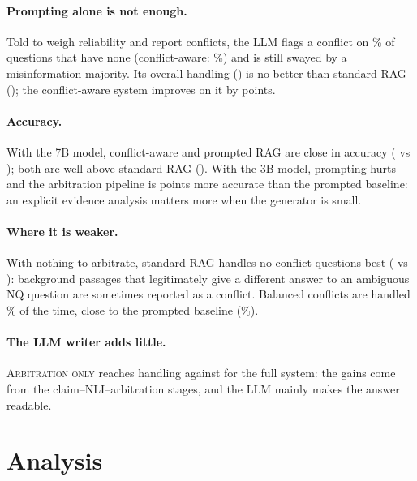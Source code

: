 \documentclass[11pt]{article}
\newcommand{\sys}[1]{\textsc{#1}}
\begin{document}
\paragraph{Prompting alone is not enough.} Told to weigh reliability and report conflicts, the LLM
flags a conflict on \% of questions that have none (conflict-aware:
\%) and is still swayed by a misinformation majority. Its overall
handling () is no better than standard RAG (); the
conflict-aware system improves on it by  points.

\paragraph{Accuracy.} With the 7B model, conflict-aware and prompted RAG are close in accuracy
( vs ); both are well above standard RAG (). With
the 3B model, prompting hurts and the arbitration pipeline is  points
more accurate than the prompted baseline: an explicit evidence analysis matters more when the
generator is small.

\paragraph{Where it is weaker.} With nothing to arbitrate, standard RAG handles no-conflict
questions best ( vs ): background passages that
legitimately give a different answer to an ambiguous NQ question are sometimes reported as a
conflict. Balanced conflicts are handled \% of the time, close to the
prompted baseline (\%).

\paragraph{The LLM writer adds little.} \sys{Arbitration only} reaches  handling
against  for the full system: the gains come from the claim--NLI--arbitration
stages, and the LLM mainly makes the answer readable.

\section{Analysis}
\end{document}
